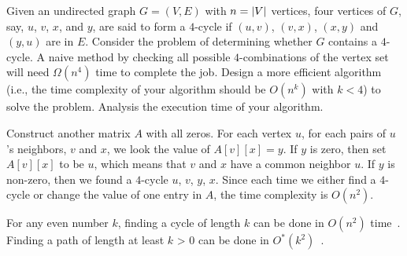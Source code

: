 \begin{Exercise}[origin={NCU CSIE 95}]
Given an undirected graph $G = (V, E)$ with $n = \lvert V\rvert$ vertices, four vertices of $G$, say, $u$, $v$, $x$, and $y$, are said to form a $4$-cycle if $(u, v)$, $(v, x)$, $(x, y)$ and $(y, u)$ are in $E$. Consider the problem of determining whether $G$ contains a $4$-cycle. A naive method by checking all possible $4$-combinations of the vertex set will need $\Omega(n^4)$ time to complete the job. Design a more efficient algorithm (i.e., the time complexity of your algorithm should be $O(n^k)$ with $k < 4$) to solve the problem. Analysis the execution time of your algorithm.
\end{Exercise}
\begin{Answer}
Construct another matrix $A$ with all zeros. For each vertex $u$, for each pairs of $u$'s neighbors, $v$ and $x$, we look the value of $A[v][x] = y$. If $y$ is zero, then set $A[v][x]$ to be $u$, which means that $v$ and $x$ have a common neighbor $u$. If $y$ is non-zero, then we found a $4$-cycle $u$, $v$, $y$, $x$. Since each time we either find a $4$-cycle or change the value of one entry in $A$, the time complexity is $O(n^2)$.
\begin{remark}
For any even number $k$, finding a cycle of length $k$ can be done in $O(n^2)$ time~\cite{Yuster1997}. Finding a path of length at least $k$ > 0 can be done in $O^*(k^2)$~\cite{Williams2009}.
\end{remark}
\end{Answer}


\printbibliography[heading=subbibliography]
